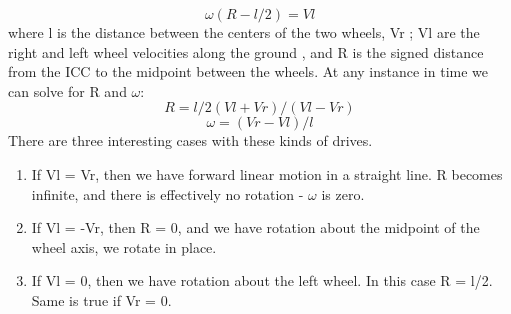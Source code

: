  \begin{equation}
   \omega(R-l/2)= Vl   
 \end{equation}       
\justify
where l is the distance between the centers of the two wheels, Vr ; Vl are the right and left wheel
velocities along the ground , and R is the signed distance from the ICC to the midpoint between the wheels. At any instance in time we can solve for R and $\omega$:
\begin{equation}
                                                                         		                                                        R= l/2 (Vl+ Vr)/(Vl-  Vr)                                                  
\end{equation}
\begin{equation}
                                                                      	                                                                 \omega= ( Vr-Vl)/l                                                    	                                                      \end{equation}
\justify
There are three interesting cases with these kinds of drives.\\
\justify
\begin{enumerate}
\item If Vl = Vr, then we have forward linear motion in a straight line. R becomes infinite, and there
is effectively no rotation - $\omega$ is zero.
\item If Vl = -Vr, then R = 0, and we have rotation about the midpoint of the wheel axis, we rotate
in place.
\item If Vl = 0, then we have rotation about the left wheel. In this case R = l/2. Same is true if Vr = 0.
\end{enumerate}
